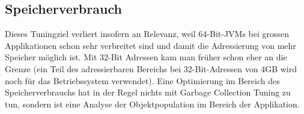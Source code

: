 \subsection{Speicherverbrauch\label{gc_tuning_speicherverbrauch}}
Dieses Tuningziel verliert insofern an Relevanz, weil 64-Bit-JVMs bei grossen Applikationen schon sehr verbreitet sind und damit die Adressierung von mehr Speicher möglich ist. Mit 32-Bit Adressen kam man früher schon eher an die Grenze (ein Teil des adressierbaren Bereichs bei 32-Bit-Adressen von 4GB wird noch für das Betriebssystem verwendet). Eine Optimierung im Bereich des Speicherverbrauchs hat in der Regel nichts mit Garbage Collection Tuning zu tun, sondern ist eine Analyse der Objektpopulation im Bereich der Applikation.

